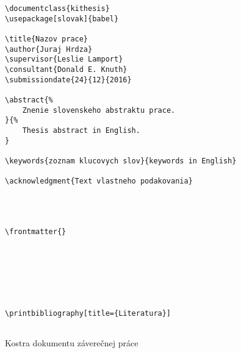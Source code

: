 \begin{listing}[ht!]
\begin{verbatim}
\documentclass{kithesis}
\usepackage[slovak]{babel}

\title{Nazov prace}
\author{Juraj Hrdza}
\supervisor{Leslie Lamport}
\consultant{Donald E. Knuth}
\submissiondate{24}{12}{2016}

\abstract{%
    Znenie slovenskeho abstraktu prace.
}{%
    Thesis abstract in English.
}

\keywords{zoznam klucovych slov}{keywords in English}

\acknowledgment{Text vlastneho podakovania}




\frontmatter{}







\printbibliography[title={Literatura}]


\end{verbatim}
\caption{Kostra dokumentu záverečnej práce}
\end{listing}

